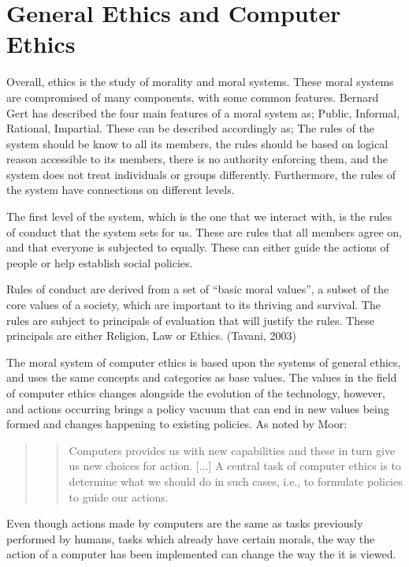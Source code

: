 \chapter{General Ethics and Computer Ethics}

Overall, ethics is the study of morality and moral systems. These moral systems are compromised of many components, with some common features. Bernard Gert has described the four main features of a moral system as; Public, Informal, Rational, Impartial.  These can be described accordingly as; The rules of the system should be know to all its members, the rules should be based on logical reason accessible to its members, there is no authority enforcing them, and the system does not treat individuals or groups differently. Furthermore, the rules of the system have connections on different levels. 

\newpar The first level of the system, which is the one that we interact with, is the rules of conduct that the system sets for us. These are rules that all members agree on, and that everyone is subjected to equally.  These can either guide the actions of people or help establish social policies. 

Rules of conduct are derived from a set of “basic moral values”, a subset of the core values of a society, which are important to its thriving and survival. The rules are subject to principals of evaluation that will justify the rules. These principals are either Religion, Law or Ethics.  (Tavani, 2003)

\newpar The moral system of computer ethics is based upon the systems of general ethics, and uses the same concepts and categories as base values. The values in the field of computer ethics changes alongside the evolution of the technology, however, and actions occurring brings a policy vacuum that can end in new values being formed and changes happening to existing policies. As noted by Moor: 

\begin{quote}
	\blockquote{Computers provides us with new capabilities and these in turn give us new choices for action. [...] A central task of computer ethics is to determine what we should do in such cases, i.e., to formulate policies to guide our actions.}\cite{moor1985computer}
\end{quote}


\noindent Even though actions made by computers are the same as tasks previously performed by humans, tasks which already have certain morals, the way the action of a computer has been implemented can change the way the it is viewed. 

